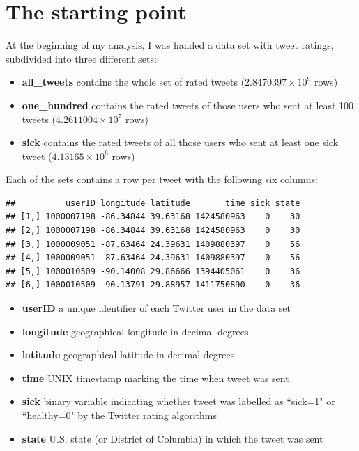 \documentclass[11pt, a4paper]{report}\usepackage[]{graphicx}\usepackage[]{color}
\makeatletter
\newenvironment{kframe}{%
 \def\at@end@of@kframe{}%
 \ifinner\ifhmode%
  \def\at@end@of@kframe{\end{minipage}}%
  \begin{minipage}{\columnwidth}%
 \fi\fi%
 \def\FrameCommand##1{\hskip\@totalleftmargin \hskip-\fboxsep
 \colorbox{shadecolor}{##1}\hskip-\fboxsep
     \hskip-\linewidth \hskip-\@totalleftmargin \hskip\columnwidth}%
 \MakeFramed {\advance\hsize-\width
   \@totalleftmargin\z@ \linewidth\hsize
   \@setminipage}}%
 {\par\unskip\endMakeFramed%
 \at@end@of@kframe}
\newenvironment{knitrout}{}{} %
\makeatother
\begin{document}
\section{The starting point}

At the beginning of my analysis, I was handed a data set with tweet ratings, subdivided into three different sets: 

\begin{itemize}
  \item \textbf{all\_tweets} contains the whole set of rated tweets (\ensuremath{2.8470397\times 10^{9}} rows)
  \item \textbf{one\_hundred} contains the rated tweets of those users who sent at least 100 tweets (\ensuremath{4.2611004\times 10^{7}} rows)
  \item \textbf{sick} contains the rated tweets of all those users who sent at least one sick tweet (\ensuremath{4.13165\times 10^{6}} rows)
\end{itemize}

Each of the sets contains a row per tweet with the following six columns: 

\begin{knitrout}
\color{fgcolor}\begin{kframe}
\begin{verbatim}
##          userID longitude latitude       time sick state
## [1,] 1000007198 -86.34844 39.63168 1424580963    0    30
## [2,] 1000007198 -86.34844 39.63168 1424580963    0    30
## [3,] 1000009051 -87.63464 24.39631 1409880397    0    56
## [4,] 1000009051 -87.63464 24.39631 1409880397    0    56
## [5,] 1000010509 -90.14008 29.86666 1394405061    0    36
## [6,] 1000010509 -90.13791 29.88957 1411750890    0    36
\end{verbatim}
\end{kframe}
\end{knitrout}

\begin{itemize}
  \item \textbf{userID} a unique identifier of each Twitter user in the data set
  \item \textbf{longitude} geographical longitude in decimal degrees
  \item \textbf{latitude} geographical latitude in decimal degrees
  \item \textbf{time} UNIX timestamp marking the time when tweet was sent
  \item \textbf{sick} binary variable indicating whether tweet was labelled as ``sick=1" or ``healthy=0" by the Twitter rating algorithms
  \item \textbf{state} U.S. state (or District of Columbia) in which the tweet was sent
\end{itemize}
\end{document}
